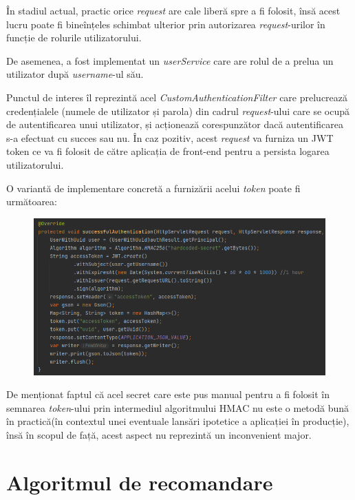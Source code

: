 \documentclass[12pt,a4paper]{report}
\begin{document}
În stadiul actual, practic orice \emph{request} are cale liberă spre a fi folosit, însă acest lucru poate fi bineînțeles schimbat ulterior prin autorizarea \emph{request}-urilor în funcție de rolurile utilizatorului.

De asemenea, a fost implementat un \emph{userService} care are rolul de a prelua un utilizator după \emph{username}-ul său.

Punctul de interes îl reprezintă acel \emph{CustomAuthenticationFilter} care prelucrează credențialele
(numele de utilizator și parola) din cadrul \emph{request}-ului care se ocupă de autentificarea unui utilizator, și acționează corespunzător dacă autentificarea s-a efectuat cu succes sau nu. În caz pozitiv, acest \emph{request} va furniza un JWT token ce va fi folosit de către aplicația de front-end pentru a persista logarea utilizatorului.

O variantă de implementare concretă a furnizării acelui \emph{token} poate fi următoarea:


\begin{figure}[H]
\centering
\caption{}
\includegraphics[scale = 0.75]{exemplu_24_jwt}
\caption*{}
\end{figure}

De menționat faptul că acel secret care este pus manual pentru a fi folosit în semnarea \emph{token}-ului prin intermediul algoritmului HMAC nu este o metodă bună în practică(în contextul unei eventuale lansări ipotetice a aplicației în producție), însă în scopul de față, acest aspect nu reprezintă un inconvenient major.


\newpage



\section{Algoritmul de recomandare}
\end{document}

